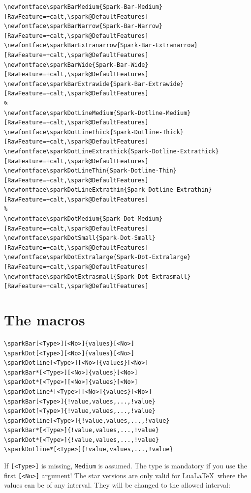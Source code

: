 \documentclass[fontsize=11pt,DIV=14,parskip=half-]{scrartcl}
\begin{document}
\small
\begin{verbatim}
\newfontface\sparkBarMedium{Spark-Bar-Medium}[RawFeature=+calt,\spark@DefaultFeatures]
\newfontface\sparkBarNarrow{Spark-Bar-Narrow}[RawFeature=+calt,\spark@DefaultFeatures]
\newfontface\sparkBarExtranarrow{Spark-Bar-Extranarrow}[RawFeature=+calt,\spark@DefaultFeatures]
\newfontface\sparkBarWide{Spark-Bar-Wide}[RawFeature=+calt,\spark@DefaultFeatures]
\newfontface\sparkBarExtrawide{Spark-Bar-Extrawide}[RawFeature=+calt,\spark@DefaultFeatures]
%
\newfontface\sparkDotLineMedium{Spark-Dotline-Medium}[RawFeature=+calt,\spark@DefaultFeatures]
\newfontface\sparkDotLineThick{Spark-Dotline-Thick}[RawFeature=+calt,\spark@DefaultFeatures]
\newfontface\sparkDotLineExtrathick{Spark-Dotline-Extrathick}[RawFeature=+calt,\spark@DefaultFeatures]
\newfontface\sparkDotLineThin{Spark-Dotline-Thin}[RawFeature=+calt,\spark@DefaultFeatures]
\newfontface\sparkDotLineExtrathin{Spark-Dotline-Extrathin}[RawFeature=+calt,\spark@DefaultFeatures]
%
\newfontface\sparkDotMedium{Spark-Dot-Medium}[RawFeature=+calt,\spark@DefaultFeatures]
\newfontface\sparkDotSmall{Spark-Dot-Small}[RawFeature=+calt,\spark@DefaultFeatures]
\newfontface\sparkDotExtralarge{Spark-Dot-Extralarge}[RawFeature=+calt,\spark@DefaultFeatures]
\newfontface\sparkDotExtrasmall{Spark-Dot-Extrasmall}[RawFeature=+calt,\spark@DefaultFeatures]
\end{verbatim}

\normalsize

\section{The macros}

\begin{verbatim}
\sparkBar[<Type>][<No>]{values}[<No>]
\sparkDot[<Type>][<No>]{values}[<No>]
\sparkDotline[<Type>][<No>]{values}[<No>]
\sparkBar*[<Type>][<No>]{values}[<No>]
\sparkDot*[<Type>][<No>]{values}[<No>]
\sparkDotline*[<Type>][<No>]{values}[<No>]
\sparkBar[<Type>]{!value,values,...,!value}
\sparkDot[<Type>]{!value,values,...,!value}
\sparkDotline[<Type>]{!value,values,...,!value}
\sparkBar*[<Type>]{!value,values,...,!value}
\sparkDot*[<Type>]{!value,values,...,!value}
\sparkDotline*[<Type>]{!value,values,...,!value}
\end{verbatim}

If \texttt{[<Type>]} is missing, \texttt{Medium} is assumed. The type is mandatory if you use
the first \texttt{[<No>]} argument! The star versions are only valid for Lua\LaTeX\ where the values
can be of any interval. They will be changed to the allowed interval: 
\end{document}
